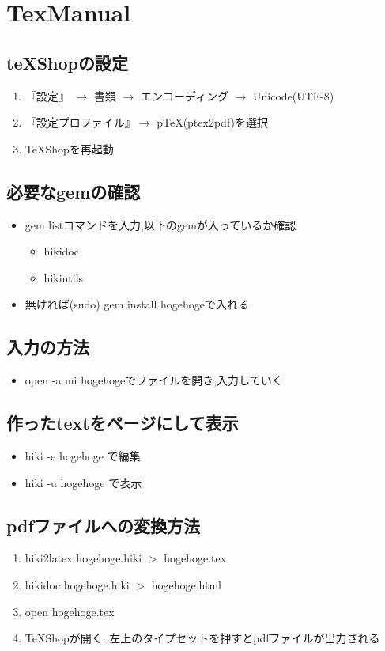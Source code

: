 \documentclass[10pt,a4j,twocolumn]{jsarticle}
\begin{document}
\section{TexManual}
\subsection{teXShopの設定}\begin{enumerate}
\item 『設定』 $\rightarrow$ ︎書類 $\rightarrow$ ︎エンコーディング $\rightarrow$ Unicode(UTF-8)
\item 『設定プロファイル』$\rightarrow$ pTeX(ptex2pdf)を選択
\item TeXShopを再起動
\end{enumerate}
\subsection{必要なgemの確認}\begin{itemize}
\item gem listコマンドを入力,以下のgemが入っているか確認\begin{itemize}
\item hikidoc
\item hikiutils
\end{itemize}
\item ︎︎無ければ(sudo) gem install hogehogeで入れる
\end{itemize}
\subsection{入力の方法}\begin{itemize}
\item open -a mi hogehogeでファイルを開き,入力していく
\end{itemize}
\subsection{作ったtextをページにして表示}\begin{itemize}
\item hiki -e hogehoge で編集
\item hiki -u hogehoge で表示
\end{itemize}
\subsection{pdfファイルへの変換方法}\begin{enumerate}
\item hiki2latex hogehoge.hiki $>$ hogehoge.tex
\item hikidoc hogehoge.hiki $>$ hogehoge.html
\item open hogehoge.tex
\item TeXShopが開く. 左上のタイプセットを押すとpdfファイルが出力される
\end{enumerate}
\end{document}
